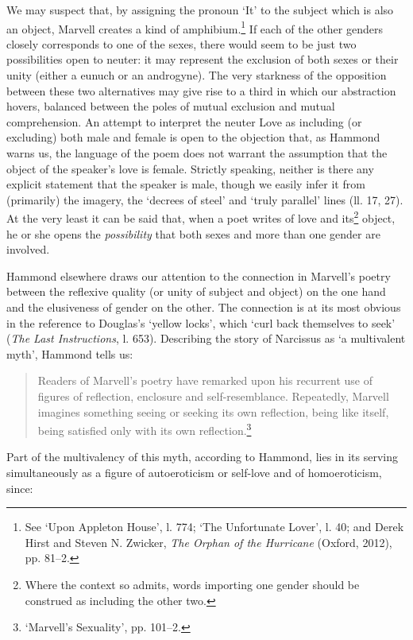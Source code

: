 ﻿\documentclass[12pt]{article}
\newcommand{\citedtitle}[1]{\textit{#1}}
\begin{document}
We may suspect that, by assigning the pronoun ‘It’ to the subject which is also an
object, Marvell creates a kind of amphibium.\footnote{See ‘Upon Appleton
House’, l. 774; ‘The Unfortunate Lover’, l. 40; and Derek Hirst and Steven N.
Zwicker, \citedtitle{The Orphan of the Hurricane} (Oxford, 2012), pp. 81–2.}
If each of the other genders closely corresponds to one of the sexes, there
would seem to be just two possibilities open to neuter: it may represent the
exclusion of both sexes or their unity (either a eunuch or an androgyne). The
very starkness of the opposition between these two alternatives may give rise
to a third in which our abstraction hovers, balanced between the poles of
mutual exclusion and mutual comprehension. An attempt to interpret the neuter
Love as including (or excluding) both male and female is open to the objection
that, as Hammond warns us, the language of the poem does not warrant the
assumption that the object of the speaker’s love is female. Strictly speaking,
neither is there any explicit statement that the speaker is male, though we
easily infer it from (primarily) the imagery, the ‘decrees of steel’ and ‘truly
parallel’ lines (ll. 17, 27). At the very least it can be said that, when a
poet writes of love and its\footnote{Where the context so
admits, words importing one gender should be construed as including the other
two.}
object, he or she opens the \emph{possibility} that both sexes and more than one
gender are involved.

Hammond
elsewhere draws our attention to the connection in Marvell’s poetry between the
reflexive quality (or unity of subject and object) on the one hand and the
elusiveness of gender on the other. The connection is at its most obvious in
the reference to Douglas’s ‘yellow locks’, which ‘curl back themselves to seek’
(\citedtitle{The Last Instructions},
l. 653). Describing the story of Narcissus as ‘a multivalent myth’, Hammond
tells us:

\begin{quote}
Readers of Marvell’s poetry have remarked upon his recurrent use of figures of reflection, enclosure and self-resemblance. Repeatedly, Marvell imagines something seeing or seeking its own reflection, being like itself, being satisfied only with its own reflection.\footnote{‘Marvell’s Sexuality’, pp. 101–2.}
\end{quote}
Part of the multivalency of this myth, according to Hammond, lies in its serving
simultaneously as a figure of autoeroticism or self-love and of homoeroticism,
since:
\end{document}
